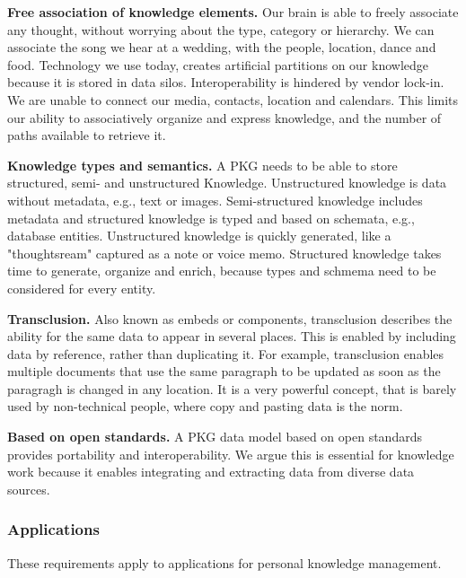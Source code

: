 \textbf{Free association of knowledge elements.} Our brain is able to freely associate any thought, without worrying about the type, category or hierarchy. We can associate the song we hear at a wedding, with the people, location, dance and food. Technology we use today, creates artificial partitions on our knowledge because it is stored in data silos. Interoperability is hindered by vendor lock-in. We are unable to connect our media, contacts, location and calendars. This limits our ability to associatively organize and express knowledge, and the number of paths available to retrieve it.

\textbf{Knowledge types and semantics.} A PKG needs to be able to store structured, semi- and unstructured Knowledge. Unstructured knowledge is data without metadata, e.g., text or images. Semi-structured knowledge includes metadata and structured knowledge is typed and based on schemata, e.g., database entities. Unstructured knowledge is quickly generated, like  a "thoughtsream" captured as a note or voice memo. Structured knowledge takes time to generate, organize and enrich, because types and schmema need to be considered for every entity. 

\textbf{Transclusion.} Also known as embeds or components, transclusion describes the ability for the same data to appear in several places. This is enabled by including data by reference, rather than duplicating it. For example, transclusion enables multiple documents that use the same paragraph to be updated as soon as the paragragh is changed in any location. It is a very powerful concept, that is barely used by non-technical people, where copy and pasting data is the norm.

\textbf{Based on open standards.} A PKG data model based on open standards provides portability and interoperability. We argue this is essential for knowledge work because it enables integrating and extracting data from diverse data sources.

\subsubsection*{Applications}
These requirements apply to applications for personal knowledge management. 

